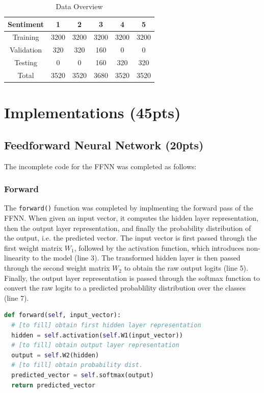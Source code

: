 \documentclass[conference]{IEEEtran}
\begin{document}
\begin{table}[htbp]
\caption{Data Overview}
\begin{center}
\begin{tabular}{cccccc}
\hline
\textbf{Sentiment} & \textbf{1} & \textbf{2} & \textbf{3} & \textbf{4} & \textbf{5} \\
\hline
Training & 3200 & 3200 & 3200 & 3200 & 3200 \\
Validation & 320 & 320 & 160 & 0 & 0 \\
Testing & 0 & 0 & 160 & 320 & 320 \\
\hline
Total & 3520 & 3520 & 3680 & 3520 & 3520 \\
\end{tabular}
\end{center}
\label{default}
\end{table}%

\section{Implementations (45pts)}

\subsection{Feedforward Neural Network (20pts)}

The incomplete code for the FFNN was completed as follows: 

\subsubsection{Forward}

The \texttt{forward()} function was completed by implmenting the forward pass of the FFNN. When given an input vector, it computes the hidden layer representation, then the output layer representation, and finally the probability distribution of the output, i.e. the predicted vector. The input vector is first passed through the first weight matrix $W_1$, followed by the activation function, which introduces non-linearity to the model (line 3). The transformed hidden layer is then passed through the second weight matrix $W_2$ to obtain the raw output logits (line 5). Finally, the output layer representation is passed through the softmax function to convert the raw logits to a predicted probablility distribution over the classes (line 7).

\begin{lstlisting}[language=Python]
def forward(self, input_vector):
  # [to fill] obtain first hidden layer representation
  hidden = self.activation(self.W1(input_vector))
  # [to fill] obtain output layer representation
  output = self.W2(hidden)
  # [to fill] obtain probability dist.
  predicted_vector = self.softmax(output)
  return predicted_vector
\end{lstlisting}
\end{document}

